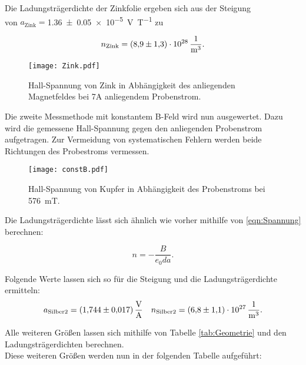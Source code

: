 \noindent Die Ladungsträgerdichte der Zinkfolie ergeben sich aus der Steigung \\
von $a_\text{Zink}=$\qty{1.36\pm0.05e-5}{\volt\per\tesla} zu 

\begin{equation*}
    n_\text{Zink} = \qty{8.9\pm1.3e28}{\per\cubic\meter}.
\end{equation*}

\begin{figure}[H]
    \centering
    \label{Zink}
    \texttt{[image: Zink.pdf]}
    \caption{Hall-Spannung von Zink in Abhängigkeit des anliegenden Magnetfeldes bei 7A anliegendem Probenstrom.}
\end{figure}

\noindent Die zweite Messmethode mit konstantem B-Feld wird nun ausgewertet. Dazu wird die gemessene Hall-Spannung 
gegen den anliegenden Probenstrom aufgetragen. Zur Vermeidung von systematischen Fehlern werden beide Richtungen des 
Probestroms vermessen.

\begin{figure}[H]
    \centering
    \texttt{[image: constB.pdf]}
    \caption{Hall-Spannung von Kupfer in Abhängigkeit des Probenstroms bei \qty{576}{\milli\tesla}.}
\end{figure}

\noindent Die Ladungsträgerdichte lässt sich ähnlich wie vorher mithilfe von \eqref{eqn:Spannung} berechnen:

\begin{equation*}
    n = - \frac{B}{e_0 d a}.
\end{equation*}

\noindent Folgende Werte lassen sich so für die Steigung und die Ladungsträgerdichte ermitteln:
\begin{align*}
    a_\text{Silber2}=\qty{1.744 \pm 0.017}{\volt\per\ampere} && n_\text{Silber2} = \qty{6.8\pm 1.1e27}{\per\cubic\meter}.
\end{align*}

\noindent Alle weiteren Größen lassen sich mithilfe von Tabelle \ref{tab:Geometrie} und den Ladungsträgerdichten 
berechnen.\\
\noindent Diese weiteren Größen werden nun in der folgenden Tabelle aufgeführt:

